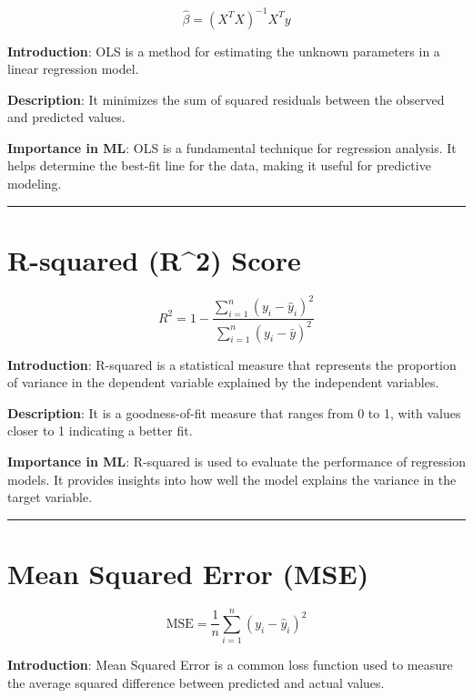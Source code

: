 \documentclass[
  12 pt,
  a4paper,
]{book}
\numberwithin{equation}{section}
\theoremstyle{plain}      %
\theoremstyle{definition} %
\theoremstyle{remark}     %
\theoremstyle{note}         %
\begin{document}
\[
\hat{\beta} = (X^T X)^{-1} X^T y
\]

\textbf{Introduction}: OLS is a method for estimating the unknown
parameters in a linear regression model.

\textbf{Description}: It minimizes the sum of squared residuals between
the observed and predicted values.

\textbf{Importance in ML}: OLS is a fundamental technique for regression
analysis. It helps determine the best-fit line for the data, making it
useful for predictive modeling.

\begin{center}\rule{0.5\linewidth}{0.5pt}\end{center}

\newpage

\newpage

\hypertarget{r-squared-r2-score}{%
\chapter{R-squared (R\^{}2) Score}\label{r-squared-r2-score}}

\[
R^2 = 1 - \frac{\sum_{i=1}^n (y_i - \hat{y}_i)^2}{\sum_{i=1}^n (y_i - \bar{y})^2}
\]

\textbf{Introduction}: R-squared is a statistical measure that
represents the proportion of variance in the dependent variable
explained by the independent variables.

\textbf{Description}: It is a goodness-of-fit measure that ranges from 0
to 1, with values closer to 1 indicating a better fit.

\textbf{Importance in ML}: R-squared is used to evaluate the performance
of regression models. It provides insights into how well the model
explains the variance in the target variable.

\begin{center}\rule{0.5\linewidth}{0.5pt}\end{center}

\newpage

\hypertarget{mean-squared-error-mse}{%
\chapter{Mean Squared Error (MSE)}\label{mean-squared-error-mse}}

\[
\text{MSE} = \frac{1}{n} \sum_{i=1}^n (y_i - \hat{y}_i)^2
\]

\textbf{Introduction}: Mean Squared Error is a common loss function used
to measure the average squared difference between predicted and actual
values.
\end{document}
